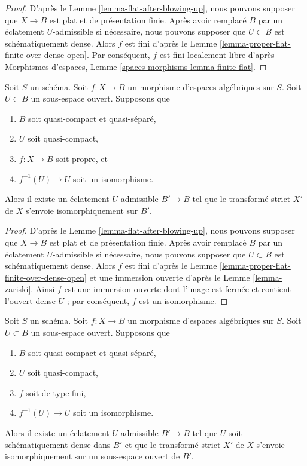 \begin{proof}
D'après le Lemme \ref{lemma-flat-after-blowing-up}, nous pouvons supposer que
$X \to B$ est plat et de présentation finie. Après avoir remplacé
$B$ par un éclatement $U$-admissible si nécessaire, nous pouvons supposer
que $U \subset B$ est schématiquement dense. Alors $f$ est
fini d'après le Lemme \ref{lemma-proper-flat-finite-over-dense-open}.
Par conséquent, $f$ est fini localement libre d'après
Morphismes d'espaces, Lemme \ref{spaces-morphisms-lemma-finite-flat}.
\end{proof}

\begin{lemma}
\label{lemma-isomorphism-after-blowing-up}
Soit $S$ un schéma. Soit $f : X \to B$ un morphisme d'espaces
algébriques sur $S$. Soit $U \subset B$ un sous-espace ouvert. Supposons que
\begin{enumerate}
\item $B$ soit quasi-compact et quasi-séparé,
\item $U$ soit quasi-compact,
\item $f : X \to B$ soit propre, et
\item $f^{-1}(U) \to U$ soit un isomorphisme.
\end{enumerate}
Alors il existe un éclatement $U$-admissible $B' \to B$ tel que
le transformé strict $X'$ de $X$ s'envoie isomorphiquement sur $B'$.
\end{lemma}

\begin{proof}
D'après le Lemme \ref{lemma-flat-after-blowing-up}, nous pouvons supposer que
$X \to B$ est plat et de présentation finie. Après avoir remplacé
$B$ par un éclatement $U$-admissible si nécessaire, nous pouvons supposer
que $U \subset B$ est schématiquement dense. Alors $f$ est
fini d'après le Lemme \ref{lemma-proper-flat-finite-over-dense-open}
et une immersion ouverte d'après le Lemme \ref{lemma-zariski}. Ainsi $f$
est une immersion ouverte dont l'image est fermée et contient
l'ouvert dense $U$ ; par conséquent, $f$ est un isomorphisme.
\end{proof}

\begin{lemma}
\label{lemma-zariski-after-blowup}
Soit $S$ un schéma. Soit $f : X \to B$ un morphisme d'espaces algébriques
sur $S$. Soit $U \subset B$ un sous-espace ouvert. Supposons que
\begin{enumerate}
\item $B$ soit quasi-compact et quasi-séparé,
\item $U$ soit quasi-compact,
\item $f$ soit de type fini,
\item $f^{-1}(U) \to U$ soit un isomorphisme.
\end{enumerate}
Alors il existe un éclatement $U$-admissible $B' \to B$ tel que $U$
soit schématiquement dense dans $B'$ et que le transformé
strict $X'$ de $X$ s'envoie isomorphiquement sur un sous-espace ouvert de $B'$.
\end{lemma}

